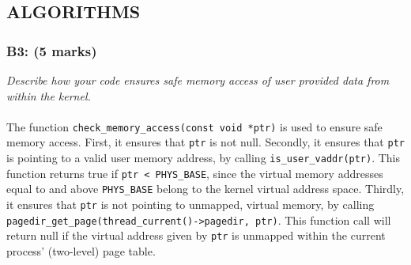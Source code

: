 \documentclass{article}
\begin{document}
\subsection{ALGORITHMS}

\subsubsection*{B3: (5 marks) }
\textit{Describe how your code ensures safe memory access of user provided data
from within the kernel. }
\\ \\
The function \texttt{check\_memory\_access(const void *ptr)} is used to ensure safe memory access. First, it ensures that \texttt{ptr} is not null. Secondly, it ensures that \texttt{ptr} is pointing to a valid user memory address, by calling \texttt{is\_user\_vaddr(ptr)}. This function returns true if \texttt{ptr < PHYS\_BASE}, since the virtual memory addresses equal to and above \texttt{PHYS\_BASE} belong to the kernel virtual address space. Thirdly, it ensures that \texttt{ptr} is not pointing to unmapped, virtual memory, by calling \texttt{pagedir\_get\_page(thread\_current()->pagedir, ptr)}. This function call will return null if the virtual address given by \texttt{ptr} is unmapped within the current process' (two-level) page table.
\end{document}
